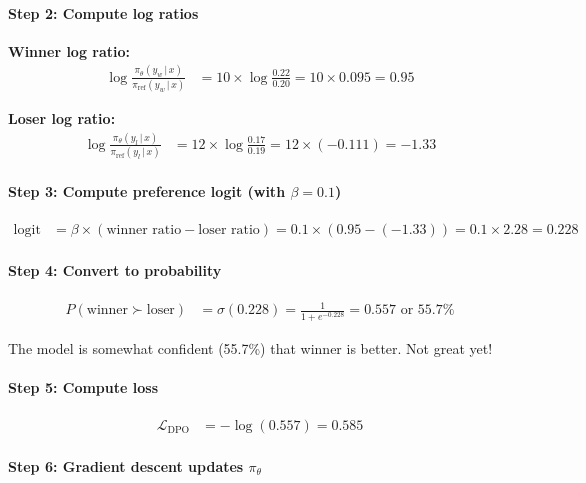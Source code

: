 \begin{chapterenv}
\paragraph{Step 2: Compute log ratios}

\textbf{Winner log ratio:}
\begin{align*}
\log \frac{\pi_\theta(y_w \,|\, x)}{\pi_{\text{ref}}(y_w \,|\, x)} &= 10 \times \log \frac{0.22}{0.20} = 10 \times 0.095 = 0.95
\end{align*}

\textbf{Loser log ratio:}
\begin{align*}
\log \frac{\pi_\theta(y_l \,|\, x)}{\pi_{\text{ref}}(y_l \,|\, x)} &= 12 \times \log \frac{0.17}{0.19} = 12 \times (-0.111) = -1.33
\end{align*}

\paragraph{Step 3: Compute preference logit (with $\beta = 0.1$)}

\begin{align*}
\text{logit} &= \beta \times (\text{winner ratio} - \text{loser ratio}) = 0.1 \times (0.95 - (-1.33)) = 0.1 \times 2.28 = 0.228
\end{align*}

\paragraph{Step 4: Convert to probability}

\begin{align*}
P(\text{winner} \succ \text{loser}) &= \sigma(0.228) = \frac{1}{1 + e^{-0.228}} = 0.557 \text{ or } 55.7\%
\end{align*}

The model is somewhat confident (55.7\%) that winner is better. Not great yet!

\paragraph{Step 5: Compute loss}

\begin{align*}
\mathcal{L}_{\text{DPO}} &= -\log(0.557) = 0.585
\end{align*}

\paragraph{Step 6: Gradient descent updates $\pi_\theta$}


\end{chapterenv}
